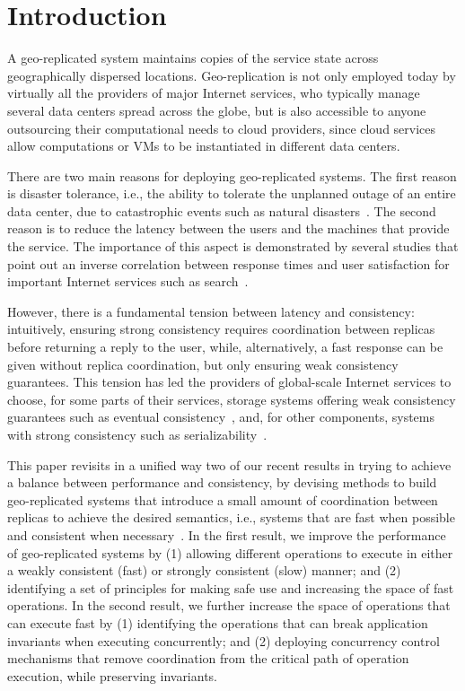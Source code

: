 \documentclass[11pt,dvipdfm]{article}
\begin{document}
\section{Introduction}

A geo-replicated system maintains copies of the service state across geographically dispersed locations.
Geo-replication is not only employed today by virtually all the providers of major Internet services, who typically manage several data centers spread across the globe, but is also accessible to anyone outsourcing their computational needs to cloud providers, since cloud services allow computations or VMs to be instantiated in different data centers.

There are two main reasons for deploying geo-replicated systems. The first reason is disaster tolerance, i.e., the ability to tolerate the unplanned outage of an entire data center, due to catastrophic events such as natural disasters~\cite{dc-outages}. The second reason is to reduce the latency between the users and the machines that provide the service. The importance of this aspect is demonstrated by several studies that point out an inverse correlation between response times and user satisfaction for important Internet services such as search~\cite{Schurman2009latency}.


However, there is a fundamental tension between latency and consistency: intuitively, ensuring strong consistency requires coordination between replicas before returning a reply to the user, while, alternatively, a fast response can be given without replica coordination, but only ensuring weak consistency guarantees. This tension has led the providers of global-scale Internet services to choose, for some parts of their services, storage systems offering weak consistency guarantees such as eventual consistency~\cite{dynamo}, and, for other components, systems with strong consistency such as serializability~\cite{Bernstein1987CCR}.

This paper revisits in a unified way two of our recent results in trying to achieve a balance between performance and consistency, by devising methods to build geo-replicated systems that introduce a small amount of coordination between replicas to achieve the desired semantics, i.e., systems that are fast when possible and consistent when necessary~\cite{Li2012RedBlue, Balegas2015Indigo}.
In the first result, we improve the performance of geo-replicated systems by (1) allowing different operations to execute in either a weakly consistent (fast) or strongly consistent (slow) manner; and (2) identifying a set of principles for making safe use
and increasing the space of fast operations.
In the second result, we further increase the space of operations that can execute fast by (1) identifying the operations that can break application invariants when executing concurrently; and (2) deploying concurrency control mechanisms that remove coordination from the critical path of operation execution, while preserving invariants.
\end{document}
